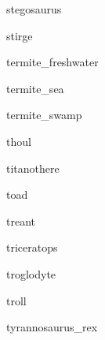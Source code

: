 \documentclass[letterpaper,serif]{module}
\begin{document}
\begin{newmonster}{stegosaurus}\end{newmonster}

\begin{newmonster}{stirge}\end{newmonster}

\begin{newmonster}{termite_freshwater}\end{newmonster}

\begin{newmonster}{termite_sea}\end{newmonster}

\begin{newmonster}{termite_swamp}\end{newmonster}

\begin{newmonster}{thoul}\end{newmonster}

\begin{newmonster}{titanothere}\end{newmonster}

\begin{newmonster}{toad}\end{newmonster}

\begin{newmonster}{treant}\end{newmonster}

\begin{newmonster}{triceratops}\end{newmonster}

\begin{newmonster}{troglodyte}\end{newmonster}

\begin{newmonster}{troll}\end{newmonster}

\begin{newmonster}{tyrannosaurus_rex}\end{newmonster}
\end{document}
